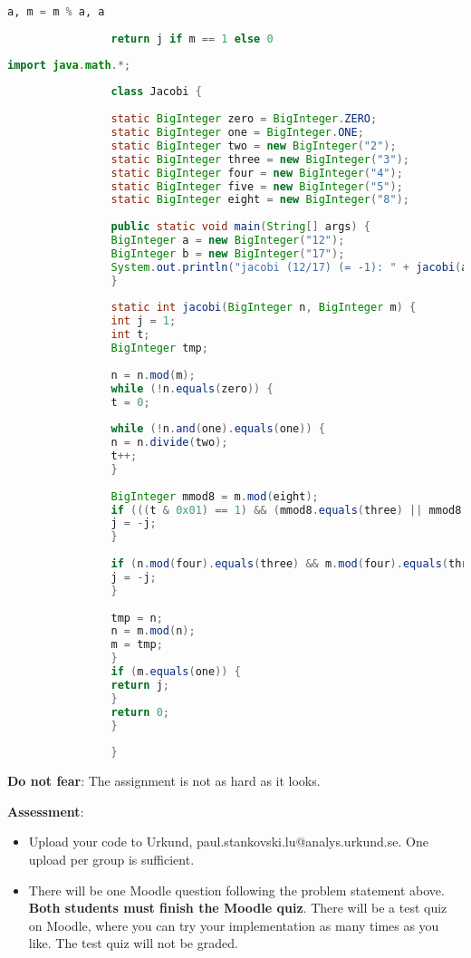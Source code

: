 \documentclass{article}
\begin{document}
\begin{description}
{\begin{lstlisting}[float=htb, style=customc, language=python, caption={The Jacobi symbol in Python.}, label={lst:jacobi}]
				a, m = m % a, a
				
				return j if m == 1 else 0
				\end{lstlisting}
				
				
				\begin{lstlisting}[float=h, style=customc, language=java, caption={The Jacobi symbol in Java.}, label={lst:jacobi_java}]
				import java.math.*;
				
				class Jacobi {
				
				static BigInteger zero = BigInteger.ZERO;
				static BigInteger one = BigInteger.ONE;
				static BigInteger two = new BigInteger("2");
				static BigInteger three = new BigInteger("3");
				static BigInteger four = new BigInteger("4");
				static BigInteger five = new BigInteger("5");
				static BigInteger eight = new BigInteger("8");
				
				public static void main(String[] args) {
				BigInteger a = new BigInteger("12");
				BigInteger b = new BigInteger("17");
				System.out.println("jacobi (12/17) (= -1): " + jacobi(a, b));
				}
				
				static int jacobi(BigInteger n, BigInteger m) {
				int j = 1;
				int t;
				BigInteger tmp;
				
				n = n.mod(m);
				while (!n.equals(zero)) {
				t = 0;
				
				while (!n.and(one).equals(one)) {
				n = n.divide(two);
				t++;
				}
				
				BigInteger mmod8 = m.mod(eight);
				if (((t & 0x01) == 1) && (mmod8.equals(three) || mmod8.equals(five))) {
				j = -j;
				}
				
				if (n.mod(four).equals(three) && m.mod(four).equals(three)) {
				j = -j;
				}
				
				tmp = n;
				n = m.mod(n);
				m = tmp;
				}
				if (m.equals(one)) {
				return j;
				}
				return 0;
				}
				
				}
				\end{lstlisting}
				
				\textbf{Do not fear}: The assignment is not as hard as it looks.
				
				\textbf{Assessment}:
				\begin{itemize}
					\item Upload your code to Urkund, paul.stankovski.lu@analys.urkund.se.
					One upload per group is sufficient.
					
					\item There will be one Moodle question following the problem statement above. 
					\textbf{Both students must finish the Moodle quiz}.
					There will be a test quiz on Moodle, where you can try your implementation as many times as you like. 
					The test quiz will not be graded.
				\end{itemize}
			}
			
		\end{description}
		
	
\end{document}
